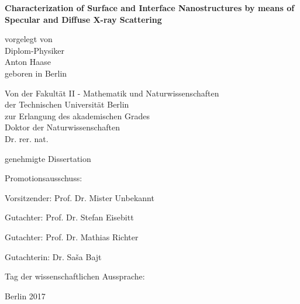 
\begin{titlepage}
{\noindent\sffamily\large%
    \begin{center}
        \vspace*{3ex}
        {\LARGE\bfseries\sffamily
            Characterization of Surface and Interface Nanostructures by means of Specular and Diffuse X-ray Scattering
        }
        \vspace{1cm}

        vorgelegt von \\
        Diplom-Physiker \\
        Anton Haase \\
        geboren in Berlin \\
        \vspace{4cm}

        Von der Fakultät II - Mathematik und Naturwissenschaften \\
        der Technischen Universität Berlin \\
        zur Erlangung des akademischen Grades \\
        Doktor der Naturwissenschaften \\
        Dr. rer. nat. \\
        \vspace{3ex}

        genehmigte Dissertation \\
        \vspace{2cm}
    \end{center}

    Promotionsausschuss:
    \vspace{2ex}

    Vorsitzender: Prof. Dr. Mister Unbekannt

    Gutachter: Prof. Dr. Stefan Eisebitt

    Gutachter: Prof. Dr. Mathias Richter

    Gutachterin: Dr. Sa\v{s}a Bajt
    \vspace{1ex}

    Tag der wissenschaftlichen Aussprache:

    \vfill
    \begin{center}
        Berlin 2017
    \end{center}
}
\end{titlepage}

\cleardoublepage

